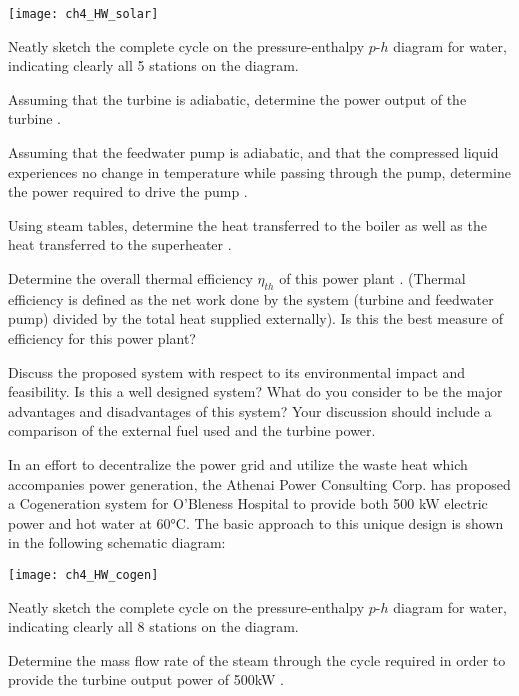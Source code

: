 \begin{homework}
  \begin{center}
     \texttt{[image: ch4\_HW\_solar]}
  \end{center}
  \begin{questionparts}
  \item Neatly sketch the complete cycle on the pressure-enthalpy $p$-$h$ diagram for water, indicating clearly all 5 stations on the diagram.
  \item Assuming that the turbine is adiabatic, determine the power output of the turbine \answer{ [976kW]}.
  \item Assuming that the feedwater pump is adiabatic, and that the compressed liquid experiences no change in temperature while passing through the pump, determine the power required to drive the pump \answer{ [0.23kW]}.
  \item Using steam tables, determine the heat transferred to the boiler \answer{ [6210kW]} as well as the heat transferred to the superheater \answer{ [747kW]}.
  \item Determine the overall thermal efficiency $\eta_{th}$ of this power plant \answer{ [14\%]}. (Thermal efficiency is defined as the net work done by the system (turbine and feedwater pump) divided by the total heat supplied externally).  Is this the best measure of efficiency for this power plant?
  \item Discuss the proposed system with respect to its environmental impact and feasibility. Is this a well designed system? What do you consider to be the major advantages and disadvantages of this system? Your discussion should include a comparison of the external fuel used and the turbine power.
  \end{questionparts}
  \question In an effort to decentralize the power grid and utilize the waste heat which accompanies power generation, the Athenai Power Consulting Corp. has proposed a Cogeneration system for O'Bleness Hospital to provide both 500 kW electric power and hot water at 60°C. The basic approach to this unique design is shown in the following schematic diagram:
  \begin{center}
    \texttt{[image: ch4\_HW\_cogen]}
  \end{center}
  \begin{questionparts}
  \item Neatly sketch the complete cycle on the pressure-enthalpy $p$-$h$ diagram for water, indicating clearly all 8 stations on the diagram.
  \item Determine the mass flow rate of the steam through the cycle required in order to provide the turbine output power of 500kW \answer{[0.691 kg/s]}.

\end{questionparts}
\end{homework}

